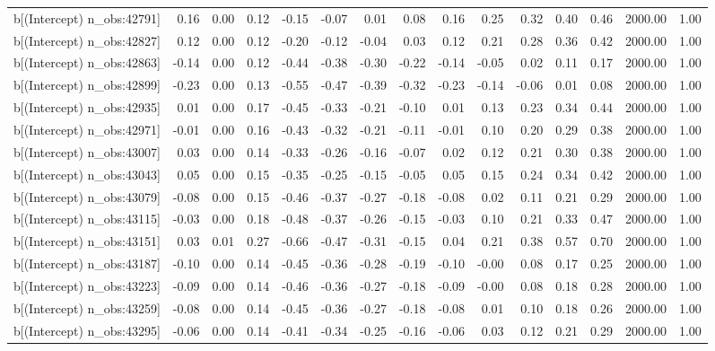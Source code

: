 \begin{table}[ht]
\begin{tabular}{rrrrrrrrrrrrrrr}
  b[(Intercept) n\_obs:42791] & 0.16 & 0.00 & 0.12 & -0.15 & -0.07 & 0.01 & 0.08 & 0.16 & 0.25 & 0.32 & 0.40 & 0.46 & 2000.00 & 1.00 \\ 
  b[(Intercept) n\_obs:42827] & 0.12 & 0.00 & 0.12 & -0.20 & -0.12 & -0.04 & 0.03 & 0.12 & 0.21 & 0.28 & 0.36 & 0.42 & 2000.00 & 1.00 \\ 
  b[(Intercept) n\_obs:42863] & -0.14 & 0.00 & 0.12 & -0.44 & -0.38 & -0.30 & -0.22 & -0.14 & -0.05 & 0.02 & 0.11 & 0.17 & 2000.00 & 1.00 \\ 
  b[(Intercept) n\_obs:42899] & -0.23 & 0.00 & 0.13 & -0.55 & -0.47 & -0.39 & -0.32 & -0.23 & -0.14 & -0.06 & 0.01 & 0.08 & 2000.00 & 1.00 \\ 
  b[(Intercept) n\_obs:42935] & 0.01 & 0.00 & 0.17 & -0.45 & -0.33 & -0.21 & -0.10 & 0.01 & 0.13 & 0.23 & 0.34 & 0.44 & 2000.00 & 1.00 \\ 
  b[(Intercept) n\_obs:42971] & -0.01 & 0.00 & 0.16 & -0.43 & -0.32 & -0.21 & -0.11 & -0.01 & 0.10 & 0.20 & 0.29 & 0.38 & 2000.00 & 1.00 \\ 
  b[(Intercept) n\_obs:43007] & 0.03 & 0.00 & 0.14 & -0.33 & -0.26 & -0.16 & -0.07 & 0.02 & 0.12 & 0.21 & 0.30 & 0.38 & 2000.00 & 1.00 \\ 
  b[(Intercept) n\_obs:43043] & 0.05 & 0.00 & 0.15 & -0.35 & -0.25 & -0.15 & -0.05 & 0.05 & 0.15 & 0.24 & 0.34 & 0.42 & 2000.00 & 1.00 \\ 
  b[(Intercept) n\_obs:43079] & -0.08 & 0.00 & 0.15 & -0.46 & -0.37 & -0.27 & -0.18 & -0.08 & 0.02 & 0.11 & 0.21 & 0.29 & 2000.00 & 1.00 \\ 
  b[(Intercept) n\_obs:43115] & -0.03 & 0.00 & 0.18 & -0.48 & -0.37 & -0.26 & -0.15 & -0.03 & 0.10 & 0.21 & 0.33 & 0.47 & 2000.00 & 1.00 \\ 
  b[(Intercept) n\_obs:43151] & 0.03 & 0.01 & 0.27 & -0.66 & -0.47 & -0.31 & -0.15 & 0.04 & 0.21 & 0.38 & 0.57 & 0.70 & 2000.00 & 1.00 \\ 
  b[(Intercept) n\_obs:43187] & -0.10 & 0.00 & 0.14 & -0.45 & -0.36 & -0.28 & -0.19 & -0.10 & -0.00 & 0.08 & 0.17 & 0.25 & 2000.00 & 1.00 \\ 
  b[(Intercept) n\_obs:43223] & -0.09 & 0.00 & 0.14 & -0.46 & -0.36 & -0.27 & -0.18 & -0.09 & -0.00 & 0.08 & 0.18 & 0.28 & 2000.00 & 1.00 \\ 
  b[(Intercept) n\_obs:43259] & -0.08 & 0.00 & 0.14 & -0.45 & -0.36 & -0.27 & -0.18 & -0.08 & 0.01 & 0.10 & 0.18 & 0.26 & 2000.00 & 1.00 \\ 
  b[(Intercept) n\_obs:43295] & -0.06 & 0.00 & 0.14 & -0.41 & -0.34 & -0.25 & -0.16 & -0.06 & 0.03 & 0.12 & 0.21 & 0.29 & 2000.00 & 1.00 \\ 

\end{tabular}
\end{table}
